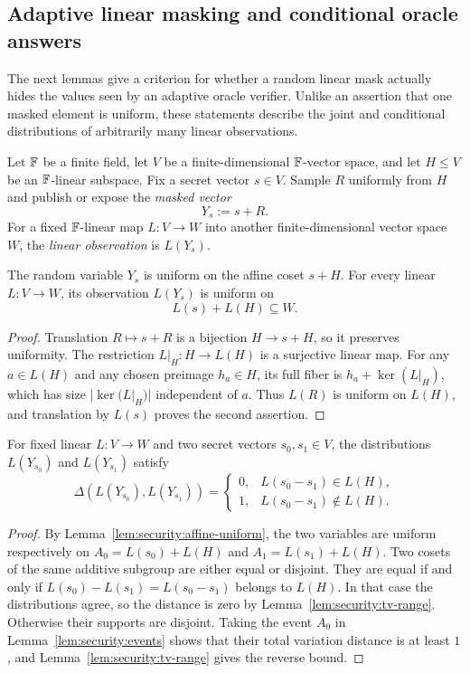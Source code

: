 \subsection{Adaptive linear masking and conditional oracle answers}\label{sec:security:linear-masks}

The next lemmas give a criterion for whether a random linear mask actually hides the values seen by an adaptive oracle verifier. Unlike an assertion that one masked element is uniform, these statements describe the joint and conditional distributions of arbitrarily many linear observations.

\begin{definition}\label{def:security:linear-mask}
Let $\mathbb{F}$ be a finite field, let $V$ be a finite-dimensional $\mathbb{F}$-vector space, and let $H\leq V$ be an $\mathbb{F}$-linear subspace. Fix a secret vector $s\in V$. Sample $R$ uniformly from $H$ and publish or expose the \emph{masked vector}
\[
 Y_s:=s+R.
\]
For a fixed $\mathbb{F}$-linear map $L:V\to W$ into another finite-dimensional vector space $W$, the \emph{linear observation} is $L(Y_s)$.
\end{definition}

\begin{lemma}\label{lem:security:affine-uniform}
The random variable $Y_s$ is uniform on the affine coset $s+H$. For every linear $L:V\to W$, its observation $L(Y_s)$ is uniform on
\[
 L(s)+L(H)\subseteq W.
\]
\end{lemma}
\begin{proof}
Translation $R\mapsto s+R$ is a bijection $H\to s+H$, so it preserves uniformity. The restriction $L|_H:H\to L(H)$ is a surjective linear map. For any $a\in L(H)$ and any chosen preimage $h_a\in H$, its full fiber is $h_a+\ker(L|_H)$, which has size $|\ker(L|_H)|$ independent of $a$. Thus $L(R)$ is uniform on $L(H)$, and translation by $L(s)$ proves the second assertion.
\end{proof}

\begin{lemma}\label{lem:security:coset-criterion}
For fixed linear $L:V\to W$ and two secret vectors $s_0,s_1\in V$, the distributions $L(Y_{s_0})$ and $L(Y_{s_1})$ satisfy
\[
 \Delta(L(Y_{s_0}),L(Y_{s_1}))
 =
 \begin{cases}
 0,&L(s_0-s_1)\in L(H),\\
 1,&L(s_0-s_1)\notin L(H).
 \end{cases}
\]
\end{lemma}
\begin{proof}
By Lemma~\ref{lem:security:affine-uniform}, the two variables are uniform respectively on $A_0=L(s_0)+L(H)$ and $A_1=L(s_1)+L(H)$. Two cosets of the same additive subgroup are either equal or disjoint. They are equal if and only if
$L(s_0)-L(s_1)=L(s_0-s_1)$ belongs to $L(H)$.
In that case the distributions agree, so the distance is zero by Lemma~\ref{lem:security:tv-range}. Otherwise their supports are disjoint. Taking the event $A_0$ in Lemma~\ref{lem:security:events} shows that their total variation distance is at least $1$, and Lemma~\ref{lem:security:tv-range} gives the reverse bound.
\end{proof}

